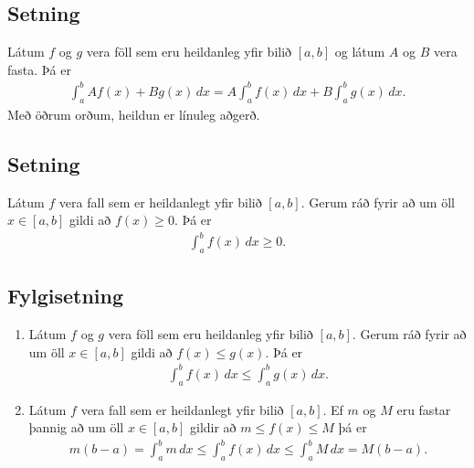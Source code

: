 \documentclass[a4paper,10pt,icelandic]{sphinxmanual}
\begin{document}
\subsection{Setning}
\label{kafli06:id4}
Látum \(f\) og \(g\) vera föll sem eru heildanleg yfir bilið
\([a,b]\) og látum \(A\) og \(B\) vera fasta. Þá er
\begin{equation*}
\begin{split}\int_a^b Af(x)+Bg(x)\,dx=A\int_a^b f(x)\,dx+B\int_a^b g(x)\,dx.\end{split}
\end{equation*}
Með öðrum orðum, heildun er línuleg aðgerð.


\subsection{Setning}
\label{kafli06:id5}
Látum \(f\) vera fall sem er heildanlegt yfir bilið \([a, b]\).
Gerum ráð fyrir að um öll \(x\in [a, b]\) gildi að
\(f(x)\geq 0\). Þá er
\begin{equation*}
\begin{split}\int_a^b f(x)\,dx\geq 0.\end{split}
\end{equation*}

\subsection{Fylgisetning}
\label{kafli06:fylgisetning}\begin{enumerate}
\item {} 
Látum \(f\) og \(g\) vera föll sem eru heildanleg yfir
bilið \([a, b]\). Gerum ráð fyrir að um öll \(x\in [a, b]\)
gildi að \(f(x)\leq g(x)\). Þá er
\begin{equation*}
\begin{split}\int_a^b f(x)\,dx\leq \int_a^b g(x)\,dx.\end{split}
\end{equation*}
\item {} 
Látum \(f\) vera fall sem er heildanlegt yfir bilið
\([a, b]\). Ef \(m\) og \(M\) eru fastar þannig að um
öll \(x\in [a, b]\) gildir að \(m\leq f(x)\leq M\) þá er
\begin{equation*}
\begin{split}m(b-a)= \int_a^b m\,dx \leq  \int_a^b f(x)\,dx \leq \int_a^b M\,dx =M(b-a).\end{split}
\end{equation*}
\end{enumerate}
\end{document}
